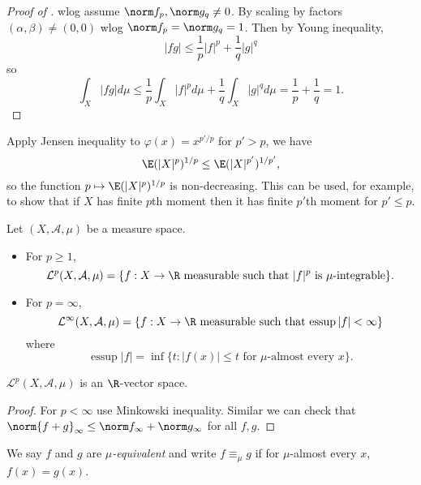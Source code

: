 \documentclass[a4paper]{article}
\DeclareMathOperator{\essup}{essup} %
\begin{document}
\begin{proof}[Proof of ]
  wlog assume \(\norm f_p, \norm g_q \neq 0\). By scaling by factors \((\alpha, \beta) \neq (0, 0)\) wlog \(\norm f_p = \norm g_q = 1\). Then by Young inequality,
  \[
    |fg| \leq \frac{1}{p} |f|^p + \frac{1}{q} |g|^q
  \]
  so
  \[
    \int_X |fg| d\mu \leq \frac{1}{p} \int_X |f|^p d\mu + \frac{1}{q} \int_X |g|^q d\mu = \frac{1}{p} + \frac{1}{q} = 1.
  \]
\end{proof}

\begin{remark}
  Apply Jensen inequality to \(\varphi(x) = x^{p'/p}\) for \(p' > p\), we have
  \[
    \E(|X|^p)^{1/p} \leq \E(|X|^{p'})^{1/p'},
  \]
  so the function \(p \mapsto \E(|X|^p)^{1/p}\) is non-decreasing. This can be used, for example, to show that if \(X\) has finite \(p\)th moment then it has finite \(p'\)th moment for \(p' \leq p\).
\end{remark}

\begin{definition}
  Let \((X, \mathcal A, \mu)\) be a measure space.
  \begin{itemize}
  \item For \(p \geq 1\),
    \[
      \mathcal L^p(X, \mathcal A, \mu) = \{f: X \to \R \text{ measurable such that \(|f|^p\) is \(\mu\)-integrable}\}.
    \]
  \item For \(p = \infty\),
    \[
      \mathcal L^\infty(X, \mathcal A, \mu) = \{f: X \to \R \text{ measurable such that \(\essup |f| < \infty\)}\}
    \]
    where
    \[
      \essup |f| = \inf \{t: |f(x)| \leq t \text{ for \(\mu\)-almost every } x\}.
    \]
  \end{itemize}
\end{definition}

\begin{lemma}
  \(\mathcal L^p(X, \mathcal A, \mu)\) is an \(\R\)-vector space.
\end{lemma}

\begin{proof}
  For \(p < \infty\) use Minkowski inequality. Similar we can check that \(\norm{f + g}_\infty \leq \norm f_\infty + \norm g_\infty\) for all \(f, g\).
\end{proof}

\begin{definition}
  We say \(f\) and \(g\) are \emph{\(\mu\)-equivalent} and write \(f \equiv_\mu g\) if for \(\mu\)-almost every \(x\), \(f(x) = g(x)\).
\end{definition}
\end{document}
